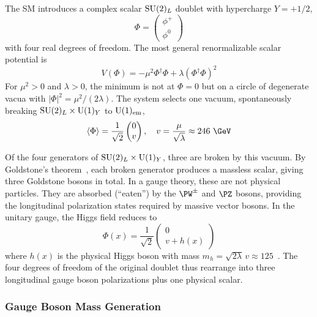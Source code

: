 The SM introduces a complex scalar $\mathrm{SU}(2)_L$ doublet with hypercharge $Y = +1/2$,
\begin{equation}
\Phi = \begin{pmatrix} \phi^+ \\ \phi^0 \end{pmatrix}
\end{equation}
with four real degrees of freedom. The most general renormalizable scalar potential is
\begin{equation}
V(\Phi) = -\mu^2 \Phi^\dagger\Phi + \lambda(\Phi^\dagger\Phi)^2
\label{eq:higgs_potential}
\end{equation}
For $\mu^2 > 0$ and $\lambda > 0$, the minimum is not at $\Phi = 0$ but on a circle of degenerate vacua with $|\Phi|^2 = \mu^2/(2\lambda)$. The system selects one vacuum, spontaneously breaking $\mathrm{SU}(2)_L \times \mathrm{U}(1)_Y$ to $\mathrm{U}(1)_{\text{em}}$,
\begin{equation}
\langle\Phi\rangle = \frac{1}{\sqrt{2}}\begin{pmatrix} 0 \\ v \end{pmatrix}, \quad v = \frac{\mu}{\sqrt{\lambda}} \approx 246~\GeV
\label{eq:higgs_vev}
\end{equation}

Of the four generators of $\mathrm{SU}(2)_L \times \mathrm{U}(1)_Y$, three are broken by this vacuum. By Goldstone's theorem~\cite{Goldstone:1961eq,Goldstone:1962es}, each broken generator produces a massless scalar, giving three Goldstone bosons in total. In a gauge theory, these are not physical particles. They are absorbed (``eaten'') by the $\PW^\pm$ and $\PZ$ bosons, providing the longitudinal polarization states required by massive vector bosons. In the unitary gauge, the Higgs field reduces to
\begin{equation}
\Phi(x) = \frac{1}{\sqrt{2}}\begin{pmatrix} 0 \\ v + h(x) \end{pmatrix}
\label{eq:unitary_gauge}
\end{equation}
where $h(x)$ is the physical Higgs boson with mass $m_h = \sqrt{2\lambda}\,v \approx 125$\GeV~\cite{ATLAS:2012yda,CMS:2012qbp}. The four degrees of freedom of the original doublet thus rearrange into three longitudinal gauge boson polarizations plus one physical scalar.

\subsubsection{Gauge Boson Mass Generation}

